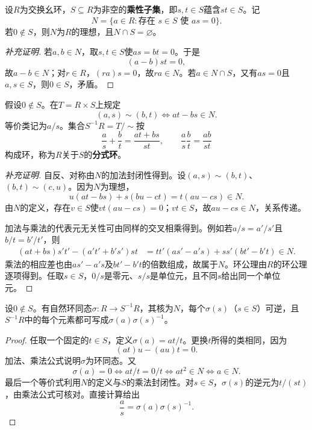 \begin{definition}
设$R$为交换幺环，$S\subseteq R$为非空的\textbf{乘性子集}，即$s,t\in S$蕴含$st\in S$。记
\[
N=\{a\in R:\text{存在 }s\in S\text{ 使 }as=0\}.
\]
若$0\notin S$，则$N$为$R$的理想，且$N\cap S=\varnothing$。
\end{definition}
\begin{proof}[补充证明]
若$a,b\in N$，取$s,t\in S$使$as=bt=0$。于是
\[
(a-b)st=0,
\]
故$a-b\in N$；对$r\in R$，$(ra)s=0$，故$ra\in N$。若$a\in N\cap S$，又有$as=0$且$a,s\in S$，则$0\in S$，矛盾。
\end{proof}

\begin{definition}
假设$0\notin S$。在$T=R\times S$上规定
\[
(a,s)\sim(b,t)\iff at-bs\in N.
\]
等价类记为$a/s$。集合$S^{-1}R=T/\!\sim$按
\[
\frac as+\frac bt=\frac{at+bs}{st},\qquad
\frac as\frac bt=\frac{ab}{st}
\]
构成环，称为$R$关于$S$的\textbf{分式环}。
\end{definition}
\begin{proof}[补充证明]
自反、对称由$N$的加法封闭性得到。设$(a,s)\sim(b,t)$、$(b,t)\sim(c,u)$。因为$N$为理想，
\[
u(at-bs)+s(bu-ct)=t(au-cs)\in N.
\]
由$N$的定义，存在$v\in S$使$vt(au-cs)=0$；$vt\in S$，故$au-cs\in N$，关系传递。

加法与乘法的代表元无关性可由同样的交叉相乘得到。例如若$a/s=a'/s'$且$b/t=b'/t'$，则
\begin{align*}
(at+bs)s't'-(a't'+b's')st
&=tt'(as'-a's)+ss'(bt'-b't)\in N.
\end{align*}
乘法的相应差也由$as'-a's$及$bt'-b't$的倍数组成，故属于$N$。环公理由$R$的环公理逐项得到。任取$s\in S$，$0/s$是零元、$s/s$是单位元，且不同$s$给出同一个单位元。
\end{proof}

\begin{theorem}\label{p2:localization-existence}
设$0\notin S$。有自然环同态$\sigma:R\to S^{-1}R$，其核为$N$，每个$\sigma(s)$（$s\in S$）可逆，且$S^{-1}R$中的每个元素都可写成$\sigma(a)\sigma(s)^{-1}$。
\end{theorem}
\begin{proof}
任取一个固定的$t\in S$，定义$\sigma(a)=at/t$。更换$t$所得的类相同，因为
\[
(at)u-(au)t=0.
\]
加法、乘法公式说明$\sigma$为环同态。又
\[
\sigma(a)=0\iff at/t=0/t\iff at^2\in N\iff a\in N.
\]
最后一个等价式利用$N$的定义与$S$的乘法封闭性。对$s\in S$，$\sigma(s)$的逆元为$t/(st)$，由乘法公式可核对。直接计算给出
\[
\frac as=\sigma(a)\sigma(s)^{-1}.
\]
\end{proof}

